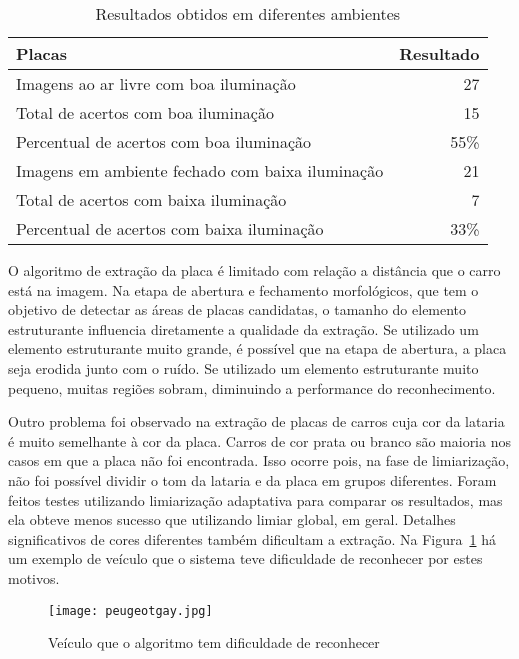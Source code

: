 \begin{table}[]
\centering
\caption{Resultados obtidos em diferentes ambientes}
\label{tab:resultados_ambientes}
\begin{tabular}{@{}lr@{}}
\toprule
Placas                                      		& \multicolumn{1}{l}{Resultado} \\ \midrule
Imagens ao ar livre com boa iluminação     			& 27                            \\
Total de acertos com boa iluminação    			 	& 15                            \\
Percentual de acertos com boa iluminação    		 & 55\%                            \\
Imagens em ambiente fechado com baixa iluminação     & 21                            \\
Total de acertos com baixa iluminação    			 & 7                            \\
Percentual de acertos com baixa iluminação 			& 33\%
\end{tabular}
\end{table}

O algoritmo de extração da placa é limitado com relação a distância que o carro
está na imagem. Na etapa de abertura e fechamento morfológicos, que tem o
objetivo de detectar as áreas de placas candidatas, o tamanho do elemento
estruturante influencia diretamente a qualidade da extração. Se utilizado um
elemento estruturante muito grande, é possível que na etapa de abertura, a placa
seja erodida junto com o ruído. Se utilizado um elemento estruturante muito
pequeno, muitas regiões sobram, diminuindo a performance do reconhecimento.

Outro problema foi observado na extração de placas de carros cuja cor da lataria
é muito semelhante à cor da placa. Carros de cor prata ou branco são maioria nos
casos em que a placa não foi encontrada. Isso ocorre pois, na fase de
limiarização, não foi possível dividir o tom da lataria e da placa em grupos
diferentes. Foram feitos testes utilizando limiarização adaptativa para comparar
os resultados, mas ela obteve menos sucesso que utilizando limiar global, em
geral. Detalhes significativos de cores diferentes também dificultam a extração.
Na Figura~\ref{fig:peugeot_gay} há um exemplo de veículo que o sistema teve
dificuldade de reconhecer por estes motivos.

\begin{figure}[H]
	\centering
	\texttt{[image: peugeotgay.jpg]}
	\caption{Veículo que o algoritmo tem dificuldade de reconhecer}
	\label{fig:peugeot_gay}
\end{figure}

